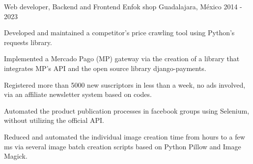 

\begin{cventries}

  \cventry
    {Web developer, Backend and Frontend}
    {Enfok shop}
    {Guadalajara, México}
    {2014 - 2023}
    {
      \begin{cvitems}
        \item {Developed and maintained a competitor's price crawling tool using Python's requests library.}
        \item {Implemented a Mercado Pago (MP) gateway via the creation of a library that integrates MP's API and the open source library django-payments.}
        \item {Registered more than 5000 new suscriptors in less than a week, no ads involved, via an affiliate newsletter system based on codes.}
        \item {Automated the product publication processes in facebook groups using Selenium, without utilizing the official API.}
        \item {Reduced and automated the individual image creation time from hours to a few ms via several image batch creation scripts based on Python Pillow and Image Magick.}
      \end{cvitems}
    }


\end{cventries}
